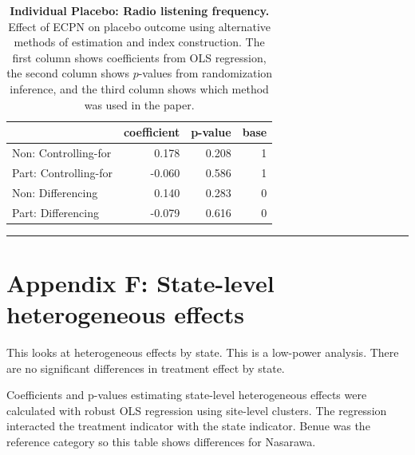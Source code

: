 \documentclass[
]{article}
\begin{document}
\begin{table}[H]
\begin{center}
\label{tab:pl_rad_ind}
\caption{\textbf{Individual Placebo: Radio listening frequency.} Effect of ECPN on placebo outcome using alternative methods of estimation and index construction. The first column shows coefficients from OLS regression, the second column shows $p$-values from randomization inference, and the third column shows which method was used in the paper.}
\smallskip

\begin{tabular}{l|r|r|r}
\hline
  & coefficient & p-value & base\\
\hline
Non: Controlling-for & 0.178 & 0.208 & 1\\
\hline
Part: Controlling-for & -0.060 & 0.586 & 1\\
\hline
Non: Differencing & 0.140 & 0.283 & 0\\
\hline
Part: Differencing & -0.079 & 0.616 & 0\\
\hline
\end{tabular}


\end{center}
\end{table}

\begin{center}\rule{0.5\linewidth}{0.5pt}\end{center}

\newpage

\hypertarget{appendix-f-state-level-heterogeneous-effects}{%
\section{Appendix F: State-level heterogeneous
effects}\label{appendix-f-state-level-heterogeneous-effects}}

This looks at heterogeneous effects by state. This is a low-power
analysis. There are no significant differences in treatment effect by
state.

Coefficients and p-values estimating state-level heterogeneous effects
were calculated with robust OLS regression using site-level clusters.
The regression interacted the treatment indicator with the state
indicator. Benue was the reference category so this table shows
differences for Nasarawa.
\end{document}
